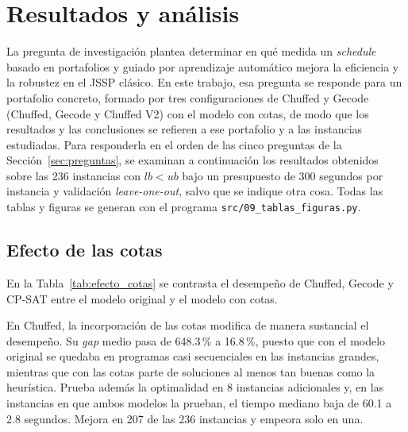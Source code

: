 \chapter{Resultados y análisis}
\label{cap:resultados}

La pregunta de investigación plantea determinar en qué medida un
\textit{schedule} basado en portafolios y guiado por aprendizaje automático
mejora la eficiencia y la robustez en el JSSP clásico. En este trabajo, esa
pregunta se responde para un portafolio concreto, formado por tres
configuraciones de Chuffed y Gecode (Chuffed, Gecode y Chuffed V2) con el
modelo con cotas, de modo que los resultados y las conclusiones se refieren a
ese portafolio y a las instancias estudiadas. Para responderla en el
orden de las cinco preguntas de la Sección~\ref{sec:preguntas}, se examinan a
continuación los resultados obtenidos sobre las 236 instancias con $lb < ub$
bajo un presupuesto de 300 segundos por instancia y validación
\textit{leave-one-out}, salvo que se indique otra cosa. Todas las tablas y
figuras se generan con el programa \texttt{src/09\_tablas\_figuras.py}.

\section{Efecto de las cotas}
\label{sec:res_cotas}

En la Tabla~\ref{tab:efecto_cotas} se contrasta el desempeño de Chuffed, Gecode
y CP-SAT entre el modelo original y el modelo con cotas.



En Chuffed, la incorporación de las cotas modifica de manera sustancial el
desempeño. Su \textit{gap} medio pasa de 648.3\,\% a 16.8\,\%, puesto que con el
modelo original se quedaba en programas casi secuenciales en las instancias
grandes, mientras que con las cotas parte de soluciones al menos tan buenas como
la heurística. Prueba además la optimalidad en 8 instancias adicionales y, en
las instancias en que ambos modelos la prueban, el tiempo mediano baja de 60.1 a
2.8 segundos. Mejora en 207 de las 236 instancias y empeora solo en una.


